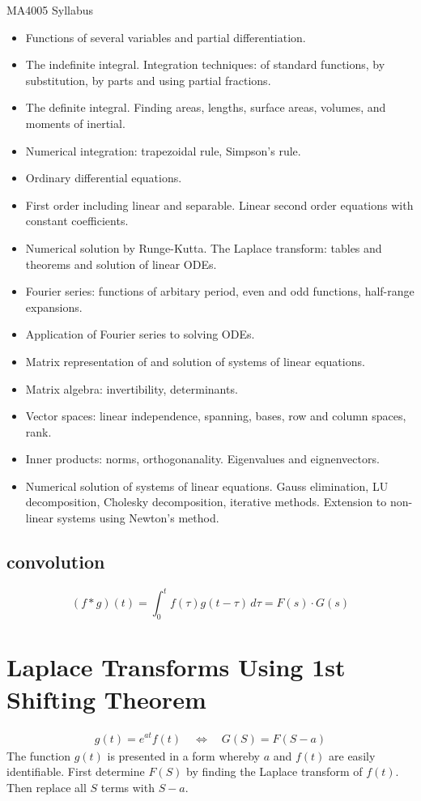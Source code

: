 \documentclass[12pt, a4paper]{article}
\begin{document}
MA4005 Syllabus
\begin{itemize}
\item Functions of several variables and partial differentiation.
\item The indefinite integral. Integration techniques: of standard functions, by substitution, by parts and using partial fractions.
\item The definite integral. Finding areas, lengths, surface areas, volumes, and moments of inertial.
\item Numerical integration: trapezoidal rule, Simpson's rule.
\item Ordinary differential equations.
\item First order including linear and separable. Linear second order equations with constant coefficients.
\item Numerical solution by Runge-Kutta. The Laplace transform: tables and theorems and solution of linear ODEs.
\item Fourier series: functions of arbitary period, even and odd functions, half-range expansions.
\item Application of Fourier series to solving ODEs.
\item Matrix representation of and solution of systems of linear equations.
\item Matrix algebra: invertibility, determinants.
\item Vector spaces: linear independence, spanning, bases, row and column spaces, rank.
\item Inner products: norms, orthogonanality. Eigenvalues and eignenvectors.
\item Numerical solution of systems of linear equations. Gauss elimination, LU decomposition, Cholesky decomposition,
iterative methods. Extension to non-linear systems using Newton's method.
\end{itemize}
\subsection{convolution}

\[ (f * g)(t) = \int_0^t f(\tau)g(t-\tau)\,d\tau= F(s) \cdot G(s) \]



\section{Laplace Transforms Using 1st Shifting Theorem}
\begin{eqnarray}
 g(t) = e^{at}f(t) \quad \Leftrightarrow \quad G(S)= F(S-a) \nonumber
\end{eqnarray}
The function $g(t)$ is presented in a form whereby $a$ and $f(t)$
are easily identifiable. First determine $F(S)$ by finding the
Laplace transform of $f(t)$. Then replace all $S$ terms with
$S-a$.
\end{document}
